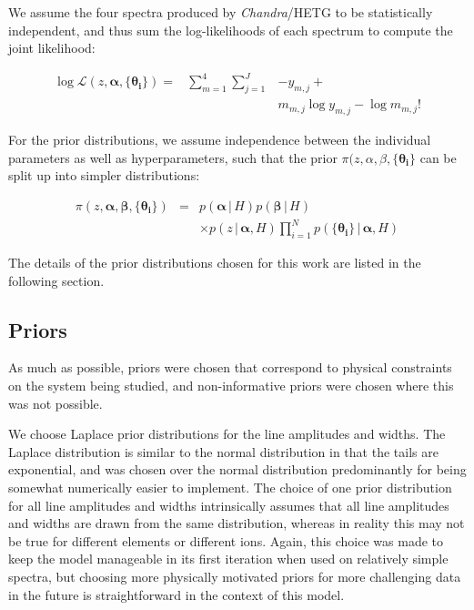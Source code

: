 \documentclass[12pt]{emulateapj}
\newcommand{\project}[1]{\textsl{#1}}
\newcommand{\chandra}{\project{Chandra}}
\newcommand{\given}{\,|\,}
\newcommand{\counts}{y}
\newcommand{\pars}{\theta}
\newcommand{\mean}{m}
\newcommand{\likelihood}{{\mathcal L}}
\begin{document}
We assume the four spectra produced by \chandra/HETG to be statistically independent, and thus sum the log-likelihoods of each spectrum to compute the joint likelihood:

\begin{eqnarray}
\log{\likelihood(z, \bm{\alpha}, \{\bm{\pars_{i}}\})} = & \sum_{m=1}^{4}\sum_{j=1}^{J} & -\counts_{m,j} + \\ \nonumber 
					    & & \mean_{m,j} \log{\counts_{m,j}} - \log{\mean_{m,j} !} %
\end{eqnarray}


\noindent For the prior distributions, we assume independence between the individual parameters as well as hyperparameters, such that the 
prior  $\pi(z, \alpha, \beta, \{\bm{\pars_{i}}\} $ can be split up into simpler distributions:

\begin{eqnarray}
\pi(z, \bm{\alpha}, \bm{\beta}, \{\bm{\pars_{i}}\} ) & = & p(\bm{\alpha} \given H) p(\bm{\beta} \given H)  \\	
					& & \times p(z \given \bm{\alpha}, H) \prod_{i=1}^{N}{p( \{\bm{\pars_{i}}\} \given \bm{\alpha}, H)} \nonumber
\end{eqnarray}

The details of the prior distributions chosen for this work are listed in the following section.

\subsection{Priors}
\label{sec:priors}

As much as possible, priors were chosen that correspond to physical constraints on the system being studied, and non-informative priors were chosen where this was not possible. 

We choose Laplace prior distributions for the line amplitudes and widths. The Laplace distribution is similar to the normal distribution in that the tails are exponential, and was chosen over the normal distribution predominantly for being somewhat numerically easier to implement. The choice of one prior distribution for all line amplitudes and widths intrinsically assumes that all line amplitudes and widths are drawn from the same distribution, whereas in reality this may not be true for different elements or different ions. Again, this choice was made to keep the model manageable in its first iteration when used on relatively simple spectra, but choosing more physically motivated priors for more challenging data in the future is straightforward in the context of this model.
\end{document}
